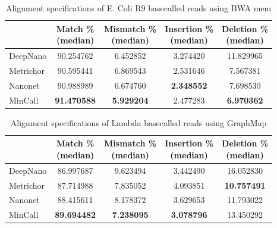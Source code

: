 \documentclass[runningheads,a4paper]{llncs}
\begin{document}
\begin{table}[]
    \caption{Alignment specifications of E. Coli R9 basecalled reads using BWA mem}
    \label{tbl:ecoli_rates_bwa}
    \centering
    \begin{tabular}{lcccc}
        \toprule
        {} &  \thead{Match \% \\(median)} &  \thead{Mismatch \% \\(median)} &  \thead{Insertion \% \\(median)} &  \thead{Deletion \% \\(median)} \\
        \midrule
        DeepNano   &                  90.254762 &                      6.452852 &                       3.274420 &                     11.829965 \\
        Metrichor  &                  90.595441 &                      6.869543 &                       2.531646 &                      7.567381 \\
        Nanonet    &                  90.988989 &                      6.674760 &                     \textbf{  2.348552} &                      7.698530 \\
        MinCall    &                 \textbf{ 91.470588} &                      \textbf{5.929204 }&                       2.477283 &                     \textbf{ 6.970362} \\
        \bottomrule
    \end{tabular}

\end{table}
\begin{table}[]
    \caption{Alignment specifications of Lambda basecalled reads using GraphMap}
    \label{tbl:lambda_rates}
    \centering
    \begin{tabular}{lcccc}
        \toprule
        {} &  \thead{Match \% \\(median)} &  \thead{Mismatch \% \\(median)} &  \thead{Insertion \% \\(median)} &  \thead{Deletion \% \\(median)} \\
        \midrule
        DeepNano   &                  86.997687 &                      9.623494 &                       3.442490 &                     16.052830 \\
        Metrichor  &                  87.714988 &                      7.835052 &                       4.093851 &                     \textbf{10.757491} \\
        Nanonet    &                  88.415611 &                      8.178372 &                       3.629653 &                     11.793022 \\
        MinCall    &                 \textbf{ 89.694482} &                     \textbf{ 7.238095} &                       \textbf{3.078796} &                     13.450292 \\
        \bottomrule
    \end{tabular}

\end{table}
\end{document}
